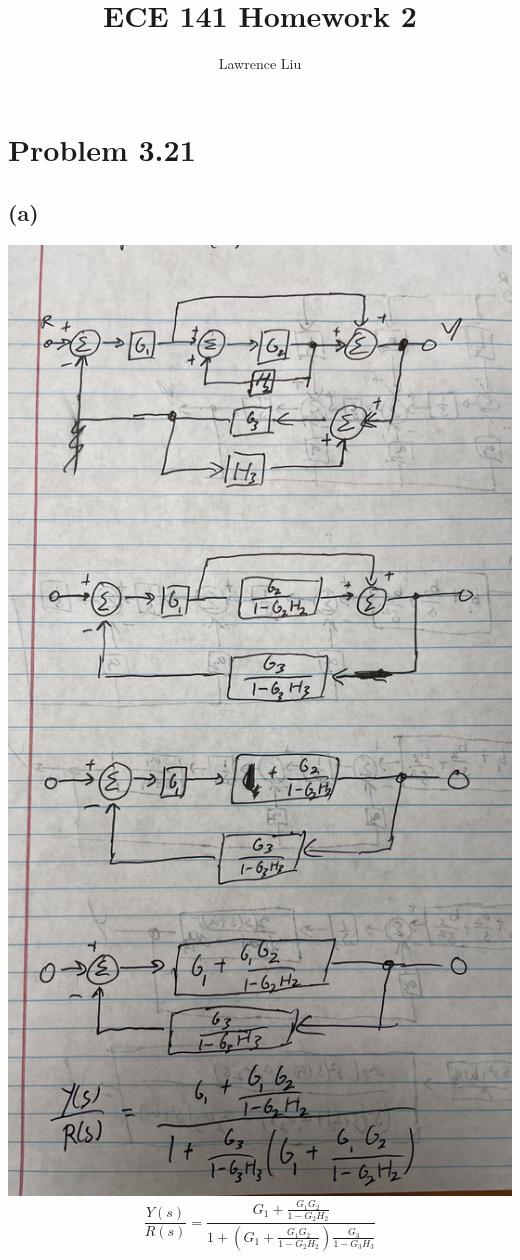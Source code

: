 \documentclass[12pt]{article}
\title{ECE 141 Homework 2}
\author{Lawrence Liu}
\begin{document}
\maketitle
\section*{Problem 3.21}
\subsection*{(a)}
\includegraphics[scale=0.1]{Problem1a.JPG}
\FloatBarrier
$$\frac{Y(s)}{R(s)}=\frac{G_1+\frac{G_1G_2}{1-G_2H_2}}{1+\left(G_1+\frac{G_1G_2}{1-G_2H_2}\right)\frac{G_3}{1-G_3H_3}}$$
\end{document}
